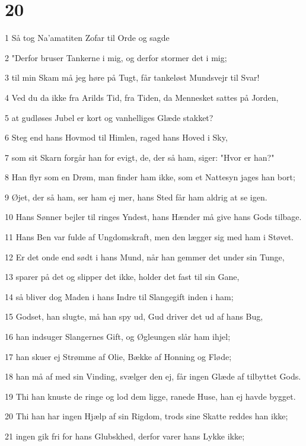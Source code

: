 \chapter{20}

\par 1 Så tog Na'amatiten Zofar til Orde og sagde
\par 2 "Derfor bruser Tankerne i mig, og derfor stormer det i mig;
\par 3 til min Skam må jeg høre på Tugt, får tankeløst Mundsvejr til Svar!
\par 4 Ved du da ikke fra Arilds Tid, fra Tiden, da Mennesket sattes på Jorden,
\par 5 at gudløses Jubel er kort og vanhelliges Glæde stakket?
\par 6 Steg end hans Hovmod til Himlen, raged hans Hoved i Sky,
\par 7 som sit Skarn forgår han for evigt, de, der så ham, siger: "Hvor er han?"
\par 8 Han flyr som en Drøm, man finder ham ikke, som et Nattesyn jages han bort;
\par 9 Øjet, der så ham, ser ham ej mer, hans Sted får ham aldrig at se igen.
\par 10 Hans Sønner bejler til ringes Yndest, hans Hænder må give hans Gods tilbage.
\par 11 Hans Ben var fulde af Ungdomskraft, men den lægger sig med ham i Støvet.
\par 12 Er det onde end sødt i hans Mund, når han gemmer det under sin Tunge,
\par 13 sparer på det og slipper det ikke, holder det fast til sin Gane,
\par 14 så bliver dog Maden i hans Indre til Slangegift inden i ham;
\par 15 Godset, han slugte, må han spy ud, Gud driver det ud af hans Bug,
\par 16 han indsuger Slangernes Gift, og Øgleungen slår ham ihjel;
\par 17 han skuer ej Strømme af Olie, Bække af Honning og Fløde;
\par 18 han må af med sin Vinding, svælger den ej, får ingen Glæde af tilbyttet Gods.
\par 19 Thi han knuste de ringe og lod dem ligge, ranede Huse, han ej havde bygget.
\par 20 Thi han har ingen Hjælp af sin Rigdom, trods sine Skatte reddes han ikke;
\par 21 ingen gik fri for hans Glubskhed, derfor varer hans Lykke ikke;
